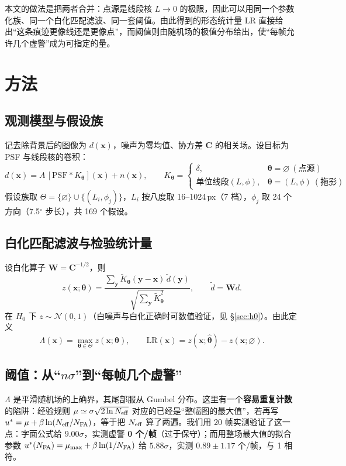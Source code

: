 \documentclass[11pt,a4paper]{ctexart}
\newcommand{\Lam}{\ensuremath{\Lambda}}
\begin{document}
本文的做法是把两者合并：点源是线段核 $L\to0$ 的极限，因此可以用同一个参数化族、同一个白化匹配滤波、同一套阈值。由此得到的形态统计量 $\mathrm{LR}$ 直接给出“这条痕迹更像线还是更像点”，而阈值则由随机场的极值分布给出，使“每帧允许几个虚警”成为可指定的量。

\section{方法}
\subsection{观测模型与假设族}
记去除背景后的图像为 $d(\mathbf x)$，噪声为零均值、协方差 $\mathbf C$ 的相关场。设目标为 PSF 与线段核的卷积：
\begin{equation}
d(\mathbf x)=A\,[\mathrm{PSF}\ast K_{\boldsymbol\theta}](\mathbf x)+n(\mathbf x),\qquad
K_{\boldsymbol\theta}=\begin{cases}\delta, & \boldsymbol\theta=\varnothing\ (\text{点源})\\ \text{单位线段}(L,\phi), & \boldsymbol\theta=(L,\phi)\ (\text{拖影})\end{cases}
\end{equation}
假设族取 $\Theta=\{\varnothing\}\cup\{(L_i,\phi_j)\}$，$L_i$ 按八度取 16--1024\,px（7 档），$\phi_j$ 取 24 个方向（7.5$^\circ$ 步长），共 169 个假设。

\subsection{白化匹配滤波与检验统计量}
设白化算子 $\mathbf W=\mathbf C^{-1/2}$，则
\begin{equation}
z(\mathbf x;\boldsymbol\theta)=\frac{\sum_{\mathbf y}\tilde K_{\boldsymbol\theta}(\mathbf y-\mathbf x)\,\tilde d(\mathbf y)}{\sqrt{\sum_{\mathbf y}\tilde K^2_{\boldsymbol\theta}}},\qquad \tilde d=\mathbf Wd .
\label{eq:z}
\end{equation}
在 $H_0$ 下 $z\sim\mathcal N(0,1)$（白噪声与白化正确时可数值验证，见 §\ref{sec:h0}）。由此定义
\begin{equation}
\Lam(\mathbf x)=\max_{\boldsymbol\theta\in\Theta} z(\mathbf x;\boldsymbol\theta),\qquad
\mathrm{LR}(\mathbf x)=z(\mathbf x;\hat{\boldsymbol\theta})-z(\mathbf x;\varnothing).
\end{equation}

\subsection{阈值：从“$n\sigma$”到“每帧几个虚警”}
$\Lam$ 是平滑随机场的上确界，其尾部服从 Gumbel 分布。这里有一个\textbf{容易重复计数}的陷阱：经验规则 $\mu\simeq\sigma\sqrt{2\ln N_{\rm eff}}$ 对应的已经是“整幅图的最大值”，若再写 $u^*=\mu+\beta\ln(N_{\rm eff}/N_{\rm FA})$，等于把 $N_{\rm eff}$ 算了两遍。我们用 20 帧实测验证了这一点：字面公式给 $9.00\sigma$，实测虚警 \textbf{0 个/帧}（过于保守）；而用整场最大值的拟合参数 $u^*(N_{\rm FA})=\mu_{\max}+\beta\ln(1/N_{\rm FA})$ 给 $5.88\sigma$，实测 $0.89\pm1.17$ 个/帧，与 1 相符。
\end{document}
